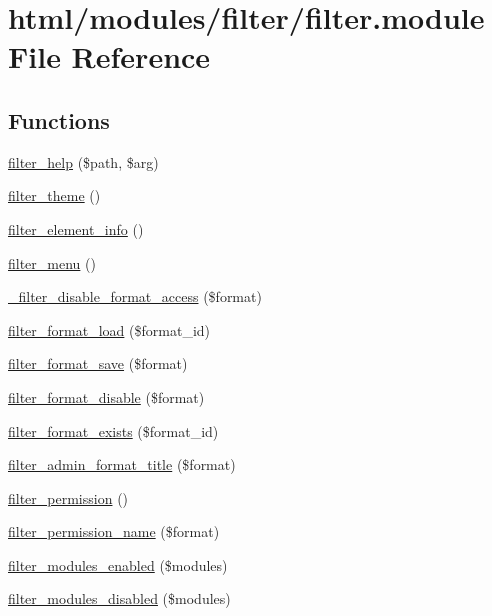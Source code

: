 \hypertarget{filter_8module}{
\section{html/modules/filter/filter.module File Reference}
\label{filter_8module}
}
\subsection*{Functions}
\begin{DoxyCompactItemize}
\item 
\hyperlink{filter_8module_acb973dd946fba16056fe3d0af900af6b}{filter\_\-help} (\$path, \$arg)
\item 
\hyperlink{filter_8module_a1ceba1ca80bae00ae5eaf6eeb2758409}{filter\_\-theme} ()
\item 
\hyperlink{filter_8module_a23474cb2d3629f4e84d3f691e2504a84}{filter\_\-element\_\-info} ()
\item 
\hyperlink{filter_8module_a13c5612763d7d98499832594ac3d5466}{filter\_\-menu} ()
\item 
\hyperlink{filter_8module_a22551a22d0b2436acc928c4f9832e616}{\_\-filter\_\-disable\_\-format\_\-access} (\$format)
\item 
\hyperlink{filter_8module_a8243109666d5f44bc7cc130743abaab3}{filter\_\-format\_\-load} (\$format\_\-id)
\item 
\hyperlink{filter_8module_a3522ef59e8cc0abe0a448cb92b0d9212}{filter\_\-format\_\-save} (\$format)
\item 
\hyperlink{filter_8module_a2d4a8c1b750647973b3130d077a598ca}{filter\_\-format\_\-disable} (\$format)
\item 
\hyperlink{filter_8module_a2145846ce416161a821a055c9169a3a1}{filter\_\-format\_\-exists} (\$format\_\-id)
\item 
\hyperlink{filter_8module_a3f678da61808bcc3d299fcb01f52e79a}{filter\_\-admin\_\-format\_\-title} (\$format)
\item 
\hyperlink{filter_8module_a58d1bbec04cb733d1107e1741627c167}{filter\_\-permission} ()
\item 
\hyperlink{filter_8module_a9e1efa58f39dde566c1c966740db1df0}{filter\_\-permission\_\-name} (\$format)
\item 
\hyperlink{filter_8module_ac9fcc24aa485e1c24fa1abf036dea521}{filter\_\-modules\_\-enabled} (\$modules)
\item 
\hyperlink{filter_8module_a7e24767aad57c1c96b57d58a12afef56}{filter\_\-modules\_\-disabled} (\$modules)

\end{DoxyCompactItemize}
